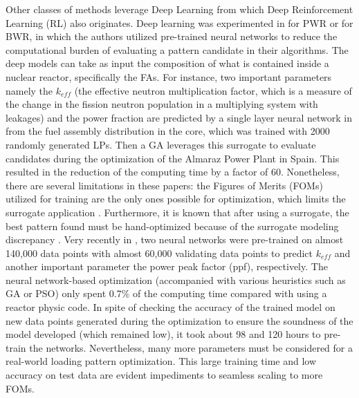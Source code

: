 \documentclass[a4paper]{article}
\begin{document}
Other classes of methods leverage Deep Learning from which Deep Reinforcement Learning (RL) also originates. Deep learning was experimented in \cite{erdogan2003apwr,li2022comparative} for PWR or \cite{ortiz2004using} for BWR, in which the authors utilized pre-trained neural networks to reduce the computational burden of evaluating a pattern candidate in their algorithms. The deep models can take as input the composition of what is contained inside a nuclear reactor, specifically the FAs. For instance, two important parameters namely the $k_{eff}$ (the effective neutron multiplication factor, which is a measure of the change in the fission neutron population in a multiplying system with leakages) and the power fraction are predicted by a single layer neural network in \cite{erdogan2003apwr} from the fuel assembly distribution in the core, which was trained with 2000 randomly generated LPs. Then a GA leverages this surrogate to evaluate candidates during the optimization of the Almaraz Power Plant in Spain. This resulted in the reduction of the computing time by a factor of 60. Nonetheless, there are several limitations in these papers: the Figures of Merits (FOMs) utilized for training are the only ones possible for optimization, which limits the surrogate application \cite{erdogan2003apwr}. Furthermore, it is known that after using a surrogate, the best pattern found must be hand-optimized because of the surrogate modeling discrepancy \cite{park2009multiobjective}. Very recently in \cite{li2022comparative}, two neural networks were pre-trained on almost 140,000 data points with almost 60,000 validating data points to predict $k_{eff}$ and another important parameter the power peak factor (ppf), respectively. The neural network-based optimization (accompanied with various heuristics such as GA or PSO) only spent 0.7\% of the computing time compared with using a reactor physic code. In spite of checking the accuracy of the trained model on new data points generated during the optimization to ensure the soundness of the model developed (which remained low), it took about 98 and 120 hours to pre-train the networks. Nevertheless, many more parameters must be considered for a real-world loading pattern optimization. This large training time and low accuracy on test data are evident impediments to seamless scaling to more FOMs. 
\end{document}
